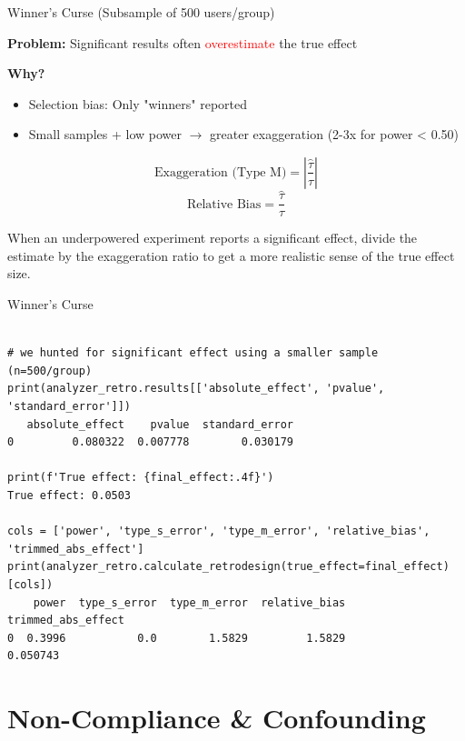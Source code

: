 \documentclass{beamer}
\newcommand{\red}[1]{\textcolor{red}{#1}}
\begin{document}
\begin{frame}{Winner's Curse  (Subsample of 500 users/group)}

\textbf{Problem:} Significant results often \red{overestimate} the true effect

\vspace{0.2cm}
\textbf{Why?}
\begin{itemize}
    \item Selection bias: Only "winners" reported
    \item Small samples + low power $\rightarrow$ greater exaggeration (2-3x for power < 0.50)
\end{itemize}
\vspace{0.2cm}
$$\text{Exaggeration (Type M)} = \left|\frac{\hat{\tau}}{\tau}\right|$$
\vspace{-0.2cm}
$$\text{Relative Bias} = \frac{\hat{\tau}}{\tau}$$

\vspace{0.1cm}
{\small When an underpowered experiment reports a significant effect, divide the estimate by the exaggeration ratio to get a more realistic sense of the true effect size.}

\end{frame}


\begin{frame}[fragile]{Winner's Curse }

\begin{verbatim}

# we hunted for significant effect using a smaller sample (n=500/group)
print(analyzer_retro.results[['absolute_effect', 'pvalue', 'standard_error']])
   absolute_effect    pvalue  standard_error
0         0.080322  0.007778        0.030179

print(f'True effect: {final_effect:.4f}')
True effect: 0.0503

cols = ['power', 'type_s_error', 'type_m_error', 'relative_bias', 'trimmed_abs_effect']
print(analyzer_retro.calculate_retrodesign(true_effect=final_effect)[cols])
    power  type_s_error  type_m_error  relative_bias  trimmed_abs_effect
0  0.3996           0.0        1.5829         1.5829            0.050743

\end{verbatim}

\end{frame}

\section{Non-Compliance \& Confounding}
\end{document}
